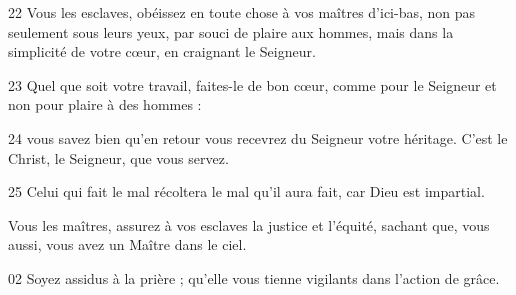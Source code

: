 
22 Vous les esclaves, obéissez en toute chose à vos maîtres d’ici-bas, non pas seulement sous leurs yeux, par souci de plaire aux hommes, mais dans la simplicité de votre cœur, en craignant le Seigneur. 

23 Quel que soit votre travail, faites-le de bon cœur, comme pour le Seigneur et non pour plaire à des hommes :

24 vous savez bien qu’en retour vous recevrez du Seigneur votre héritage. C’est le Christ, le Seigneur, que vous servez.

25 Celui qui fait le mal récoltera le mal qu’il aura fait, car Dieu est impartial.

Vous les maîtres, assurez à vos esclaves la justice et l’équité, sachant que, vous aussi, vous avez un Maître dans le ciel.

02 Soyez assidus à la prière ; qu’elle vous tienne vigilants dans l’action de grâce.